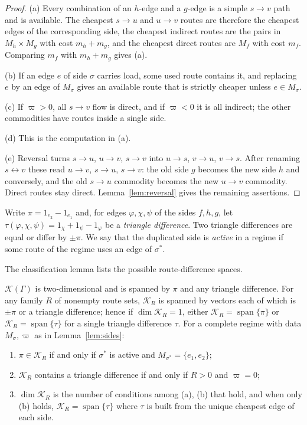 \begin{proof}
(a) Every combination of an $h$-edge and a $g$-edge is a simple
$s\to v$ path and is available. The cheapest $s\to u$ and $u\to v$ routes are
therefore the cheapest edges of the corresponding side, the cheapest
indirect routes are the pairs in $M_h\times M_g$ with cost $m_h+m_g$, and the
cheapest direct routes are $M_f$ with cost $m_f$. Comparing $m_f$ with
$m_h+m_g$ gives (a).

(b) If an edge $e$ of side $\sigma$ carries load, some used route contains
it, and replacing $e$ by an edge of $M_\sigma$ gives an available route that
is strictly cheaper unless $e\in M_\sigma$.

(c) If $\varpi>0$, all $s\to v$ flow is direct, and if $\varpi<0$ it is all
indirect; the other commodities have routes inside a single side.

(d) This is the computation in (a).

(e) Reversal turns $s\to u$, $u\to v$, $s\to v$ into $u\to s$, $v\to u$,
$v\to s$. After renaming $s\leftrightarrow v$ these read $u\to v$, $s\to u$,
$s\to v$: the old side $g$ becomes the new side $h$ and conversely, and the
old $s\to u$ commodity becomes the new $u\to v$ commodity. Direct routes stay
direct. Lemma~\ref{lem:reversal} gives the remaining assertions.
\end{proof}

Write $\pi=1_{e_2}-1_{e_1}$ and, for edges $\varphi,\chi,\psi$ of the sides
$f,h,g$, let $\tau(\varphi,\chi,\psi)=1_\chi+1_\psi-1_\varphi$ be a
\emph{triangle difference}. Two triangle differences are equal or differ by
$\pm\pi$. We say that the duplicated side is \emph{active} in a regime if
some route of the regime uses an edge of $\sigma^*$.

The classification lemma lists the possible route-difference spaces.

\begin{lemma}\label{lem:routespaces}
$\mathcal K(\Gamma)$ is two-dimensional and is spanned by $\pi$ and any
triangle difference. For any family $R$ of nonempty route sets,
$\mathcal K_R$ is spanned by vectors each of which is $\pm\pi$ or a triangle
difference; hence if $\dim\mathcal K_R=1$, either $\mathcal K_R=
\operatorname{span}\{\pi\}$ or $\mathcal K_R=\operatorname{span}\{\tau\}$ for
a single triangle difference $\tau$. For a complete regime with data
$M_\sigma,\varpi$ as in Lemma~\ref{lem:sides}:
\begin{enumerate}
\item[(a)] $\pi\in\mathcal K_R$ if and only if $\sigma^*$ is active and
 $M_{\sigma^*}=\{e_1,e_2\}$;
\item[(b)] $\mathcal K_R$ contains a triangle difference if and only if
 $R>0$ and $\varpi=0$;
\item[(c)] $\dim\mathcal K_R$ is the number of conditions among (a), (b)
 that hold, and when only (b) holds, $\mathcal K_R=\operatorname{span}\{\tau\}$
 where $\tau$ is built from the unique cheapest edge of each side.
\end{enumerate}
\end{lemma}

